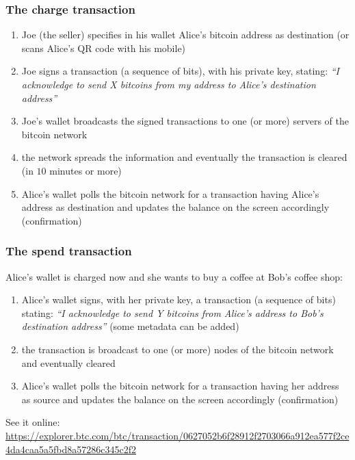 \documentclass[11pt]{beamer}  %
\begin{document}
\begin{frame}\frametitle{The charge transaction}

  \begin{enumerate}
  \item Joe (the seller) specifies in his wallet Alice's bitcoin address
    as destination (or scans Alice's QR code with his mobile)
  \item Joe signs a transaction (a sequence of bits),
    with his private key, stating: \emph{``I acknowledge
    to send X bitcoins from my address to Alice's destination address''}
  \item Joe's wallet broadcasts the signed transactions
    to one (or more) servers of the bitcoin network
  \item the network spreads the information and eventually the transaction is cleared
    (in $10$ minutes or more)
  \item Alice's wallet polls the bitcoin network for a transaction having
    Alice's address as destination and updates the balance on the screen
    accordingly (\alert{confirmation})
  \end{enumerate}

\end{frame}

\begin{frame}\frametitle{The spend transaction}

  Alice's wallet is charged now and she wants to buy a coffee at Bob's coffee shop:

  \begin{enumerate}
  \item Alice's wallet signs, with her private key, a transaction
    (a sequence of bits) stating: \emph{``I acknowledge to send Y bitcoins from Alice's address
    to Bob's destination address''} (some metadata can be added)
  \item the transaction is broadcast to one (or more) nodes of the
    bitcoin network and eventually cleared
  \item Alice's wallet polls the bitcoin network for a transaction having
    her address as source and updates the balance on the screen
    accordingly (\alert{confirmation})
  \end{enumerate}

  \medskip
  See it online:
  \url{https://explorer.btc.com/btc/transaction/0627052b6f28912f2703066a912ea577f2ce4da4caa5a5fbd8a57286c345c2f2}

\end{frame}
\end{document}
